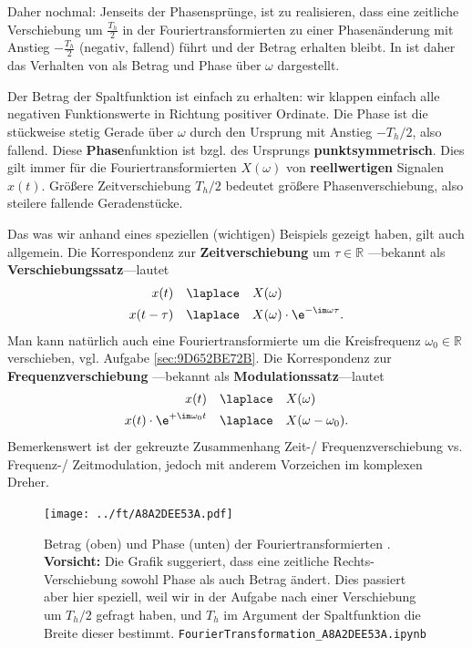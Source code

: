 \begin{Loesung}
Daher nochmal: Jenseits der Phasensprünge, ist zu realisieren, dass
eine zeitliche Verschiebung um $\frac{T_h}{2}$ in der Fouriertransformierten
zu einer Phasenänderung mit Anstieg $-\frac{T_h}{2}$ (negativ, fallend)
führt und der Betrag erhalten bleibt.
%
In  ist daher das Verhalten von  als
Betrag und Phase über $\omega$ dargestellt.

Der Betrag der Spaltfunktion ist einfach zu erhalten: wir klappen einfach alle
negativen Funktionswerte in Richtung positiver Ordinate.
%
Die Phase ist die stückweise stetig Gerade über $\omega$ durch den Ursprung
mit Anstieg $-T_h/2$, also fallend.
%
Diese \textbf{Phase}nfunktion ist bzgl. des Ursprungs \textbf{punktsymmetrisch}.
Dies gilt immer für die Fouriertransformierten $X(\omega)$ von \textbf{reellwertigen}
Signalen $x(t)$.
%
Größere Zeitverschiebung $T_h/2$ bedeutet größere Phasenverschiebung, also steilere
fallende Geradenstücke.

Das was wir anhand eines speziellen (wichtigen) Beispiels gezeigt haben, gilt auch
allgemein. Die Korrespondenz zur \textbf{Zeitverschiebung} um $\tau\in\mathbb{R}$
---bekannt als \textbf{Verschiebungssatz}---lautet
\begin{align}
x(t) & \quad \laplace \quad X(\omega)\\
x(t - \tau) & \quad \laplace \quad X(\omega) \cdot \e^{-\im\omega \tau}.
\end{align}
%
Man kann natürlich auch eine Fouriertransformierte um die Kreisfrequenz
$\omega_0\in\mathbb{R}$ verschieben, vgl. Aufgabe \ref{sec:9D652BE72B}.
%
Die Korrespondenz zur \textbf{Frequenzverschiebung}
---bekannt als \textbf{Modulationssatz}---lautet
\begin{align}
x(t) & \quad \laplace \quad X(\omega)\\
\label{eq:A8A2DEE53A_ModTheoremTime}
x(t) \cdot \e^{+\im\omega_0 t} & \quad \laplace \quad X(\omega-\omega_0).
\end{align}
%
Bemerkenswert ist der gekreuzte Zusammenhang Zeit-/ Frequenzverschiebung
vs.
Frequenz-/ Zeitmodulation,
jedoch mit anderem Vorzeichen
im komplexen Dreher.
\end{Loesung}

\begin{figure}[h!]
\centering
\texttt{[image: ../ft/A8A2DEE53A.pdf]}
  \caption{Betrag (oben) und Phase (unten) der Fouriertransformierten .
\textbf{Vorsicht:} Die Grafik suggeriert, dass eine zeitliche Rechts-Verschiebung
sowohl Phase als auch Betrag ändert. Dies passiert aber hier speziell, weil wir in der
Aufgabe nach einer Verschiebung um $T_h/2$ gefragt haben, und $T_h$
im Argument der Spaltfunktion die Breite dieser bestimmt.
\texttt{FourierTransformation\_A8A2DEE53A.ipynb}}
  \label{fig:A8A2DEE53A}
\end{figure}


